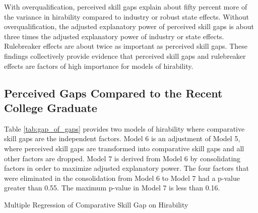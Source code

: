 \documentclass[review]{elsarticle}
\begin{document}
With overqualification, perceived skill gaps explain about fifty percent more of the variance in hirability compared to industry or robust state effects.
Without overqualification, the adjusted explanatory power of perceived skill gaps is about three times the adjusted explanatory power of industry or state effects.
Rulebreaker effects are about twice as important as perceived skill gaps.
These findings collectively provide evidence that perceived skill gaps and rulebreaker effects are factors of high importance for models of hirability.

\subsection{Perceived Gaps Compared to the Recent College Graduate}

Table \ref{tab:gap_of_gaps} provides two models of hirability where comparative skill gaps are the independent factors.
Model 6 is an adjustment of Model 5, where perceived skill gaps are transformed into comparative skill gaps and all other factors are dropped.
Model 7 is derived from Model 6 by consolidating factors in order to maximize adjusted explanatory power.
The four factors that were eliminated in the consolidation from Model 6 to Model 7 had a p-value greater than 0.55.
The maximum p-value in Model 7 is less than 0.16.

\begin{table}
    \caption{Multiple Regression of Comparative Skill Gap on Hirability}
    \resizebox{\columnwidth}{!}{
        
    }
    \label{tab:gap_of_gaps}
\end{table}
\end{document}
